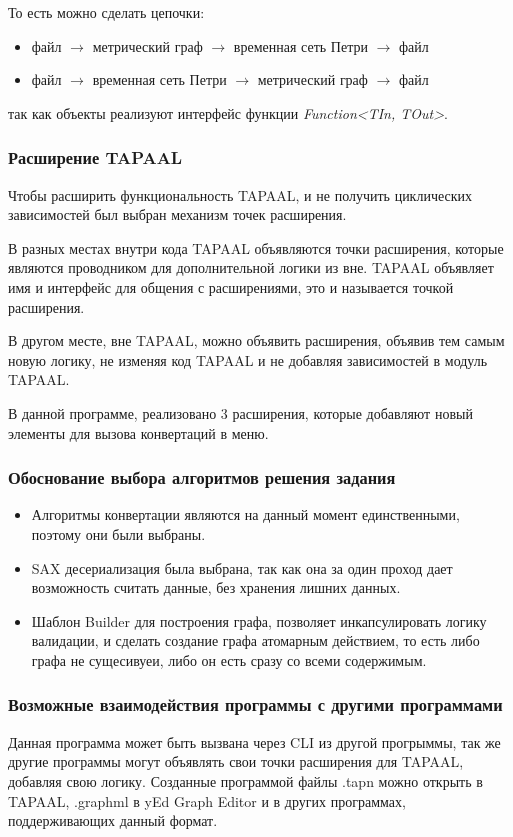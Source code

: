 \documentclass{../TechDoc}
\begin{document}
		То есть можно сделать цепочки:
		\begin{itemize}
			\item файл $\rightarrow$ метрический граф $\rightarrow$ временная сеть Петри $\rightarrow$ файл
			\item файл $\rightarrow$ временная сеть Петри $\rightarrow$ метрический граф $\rightarrow$ файл
		\end{itemize}
		
		так как объекты реализуют интерфейс функции \textit{Function<TIn, TOut>}\cite{javafunction}.
		
	\subsubsection{Расширение TAPAAL}
		Чтобы расширить функциональность TAPAAL, и не получить циклических зависимостей был выбран механизм точек расширения\cite{extension}.
		
		В разных местах внутри кода TAPAAL объявляются точки расширения, которые являются проводником для дополнительной логики из вне. TAPAAL объявляет имя и интерфейс для общения с расширениями, это и называется точкой расширения. 
		
		В другом месте, вне TAPAAL, можно объявить расширения, объявив тем самым новую логику, не изменяя код TAPAAL и не добавляя зависимостей в модуль TAPAAL.
		
		В данной программе, реализовано 3 расширения, которые добавляют новый элементы для вызова конвертаций в меню. 
		
	\subsubsection{Обоснование выбора алгоритмов решения задания}
		\begin{itemize}
			\item Алгоритмы конвертации являются на данный момент единственными, поэтому они были выбраны.
			\item SAX десериализация была выбрана, так как она за один проход дает возможность считать данные, без хранения лишних данных.
			\item Шаблон Builder для построения графа, позволяет инкапсулировать логику валидации, и сделать создание графа атомарным действием, то есть либо графа не сущесивуеи, либо он есть сразу со всеми содержимым.
		\end{itemize}
	
	\subsubsection{Возможные взаимодействия программы с другими программами}
		Данная программа может быть вызвана через CLI из другой прогрыммы, так же другие программы могут объявлять свои точки расширения для TAPAAL, добавляя свою логику.
		Созданные программой файлы .tapn можно открыть в TAPAAL, .graphml в yEd Graph Editor и в других программах, поддерживающих данный формат.
		
\end{document}
